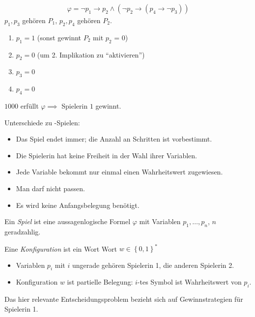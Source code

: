 \begin{tafel}
    \begin{align*}
        \varphi = \neg p_1 \rightarrow p_2 \wedge (\neg p_2 \rightarrow (p_4 \rightarrow \neg p_3))
    \end{align*}
    $p_1, p_3$ gehören $P_1$, $p_2, p_4$ gehören $P_2$.
    \begin{enumerate}
        \item $p_1 = 1$ (sonst gewinnt $P_2$ mit $p_2$ = 0)
        \item $p_2 = 0$ (um 2. Implikation zu \enquote{aktivieren})
        \item $p_3 = 0$
        \item $p_4 = 0$
    \end{enumerate}
    $1000$ erfüllt $\varphi \implies$ Spielerin $1$ gewinnt.
\end{tafel}

Unterschiede zu \ExpTime-Spielen:
\begin{itemize}
    \item Das Spiel endet immer; die Anzahl an Schritten ist vorbestimmt.
    \item Die Spielerin hat keine Freiheit in der Wahl ihrer Variablen.
    \item Jede Variable bekommt nur einmal einen Wahrheitswert zugewiesen.
    \item Man darf nicht passen.
    \item Es wird keine Anfangsbelegung benötigt.
\end{itemize}

\begin{definition}
Ein \emph{Spiel} ist eine aussagenlogische Formel $\varphi$ mit Variablen
  $p_1,\ldots,p_{n}$, $n$ geradzahlig.

  Eine \emph{Konfiguration} ist ein Wort Wort $w \in {\left\{ 0,1 \right\}}^*$
\end{definition}

\begin{itemize}
    \item Variablen $p_i$ mit $i$ ungerade gehören Spielerin 1, die anderen Spielerin 2.
    \item Konfiguration $w$ ist partielle Belegung: $i$-tes Symbol ist Wahrheitswert von $p_i$.
\end{itemize}

Das hier relevante Entscheidungsproblem bezieht sich auf Gewinnstrategien für Spielerin 1.

